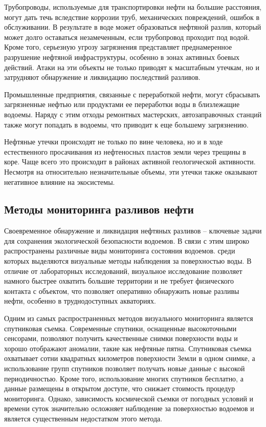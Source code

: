 Трубопроводы, используемые для транспортировки нефти на большие расстояния, могут дать течь вследствие коррозии труб, механических повреждений, ошибок в обслуживании. В результате в воде может образоваться нефтяной разлив, который может долго оставаться незамеченным, если трубопровод проходит под водой. Кроме того, серьезную угрозу загрязнения представляет преднамеренное разрушение нефтяной инфраструктуры, особенно в зонах активных боевых действий. Атаки на эти объекты не только приводят к масштабным утечкам, но и затрудняют обнаружение и ликвидацию последствий разливов.

Промышленные предприятия, связанные с переработкой нефти, могут сбрасывать загрязненные нефтью или продуктами ее переработки воды в близлежащие водоемы. Наряду с этим отходы ремонтных мастерских, автозаправочных станций также могут попадать в водоемы, что приводит к еще большему загрязнению.

Нефтяные утечки происходят не только по вине человека, но и в ходе естественного просачивания из нефтеносных пластов земли через трещины в коре. Чаще всего это происходит в районах активной геологической активности. Несмотря на относительно незначительные объемы, эти утечки также оказывают негативное влияние на экосистемы.

\subsection{Методы мониторинга разливов нефти}

Своевременное обнаружение и ликвидация нефтяных разливов -- ключевые задачи для сохранения экологической безопасности водоемов. В связи с этим широко распространены различные виды мониторинга состояния водоемов. среди которых выделяются визуальные методы наблюдения за поверхностью воды. В отличие от лабораторных исследований, визуальное исследование позволяет намного быстрее охватить большие территории и не требует физического контакта с объектом, что позволяет оперативно обнаружить новые разливы нефти, особенно в труднодоступных акваториях. 

Одним из самых распространенных методов визуального мониторинга является спутниковая съемка. Современные спутники, оснащенные высокоточными сенсорами, позволяют получить качественные снимки поверхности воды и хорошо отображают аномалии, такие как нефтяные пятна. Спутниковая съемка охватывает сотни квадратных километров поверхности Земли в одном снимке, а использование групп спутников позволяет получать новые данные с высокой периодичностью. Кроме того, использование многих спутников бесплатно, а данные размещены в открытом доступе, что снижает стоимость процедур мониторинга. Однако, зависимость космической съемки от погодных условий и времени суток значительно осложняет наблюдение за поверхностью водоемов и является существенным недостатком этого метода.

